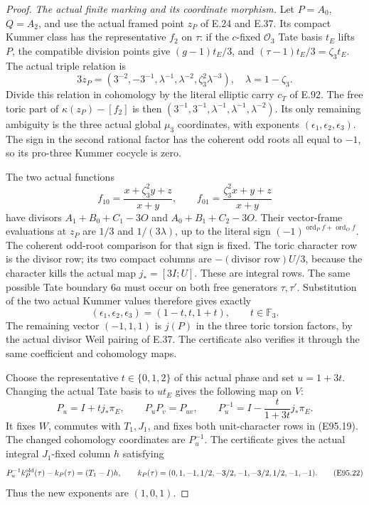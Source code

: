 \begin{proof}
\emph{The actual finite marking and its coordinate morphism.}
Let $P=A_0$, $Q=A_2$, and use the actual framed point
$z_P$ of E.24 and E.37. Its compact Kummer class has the
representative $f_2$ on $\tau$: if the $c$-fixed
$\mathcal O_3$ Tate basis $t_E$ lifts $P$, the compatible
division points give $(g-1)t_E/3$, and
$(\tau-1)t_E/3=\zeta_3t_E$. The actual triple relation is
\[
 3z_P=(3^{-2},-3^{-1},\lambda^{-1},\lambda^{-2},
                   \zeta_3^2\lambda^{-3}),
 \quad\lambda=1-\zeta_3.
 \tag{E95.18}
\]
Divide this relation in cohomology by the literal elliptic
carry $c_T$ of E.92. The free toric part of
$\kappa(z_P)-[f_2]$ is then
$(3^{-1},3^{-1},\lambda^{-1},\lambda^{-1},\lambda^{-2})$.
Its only remaining ambiguity is the three actual global
$\mu_3$ coordinates, with exponents
$(\epsilon_1,\epsilon_2,\epsilon_3)$. The sign in the
second rational factor has the coherent odd roots all
equal to $-1$, so its pro-three Kummer cocycle is zero.

The two actual functions
\[
 f_{10}=\frac{x+\zeta_3^2y+z}{x+y},\qquad
 f_{01}=\frac{\zeta_3^2x+y+z}{x+y}
 \tag{E95.19}
\]
have divisors $A_1+B_0+C_1-3O$ and
$A_0+B_1+C_2-3O$. Their vector-frame evaluations at
$z_P$ are $1/3$ and $1/(3\lambda)$, up to the literal
sign $(-1)^{\operatorname{ord}_P f+\operatorname{ord}_O f}$.
The coherent odd-root comparison for that sign is fixed.
The toric character row is the divisor row; its two
compact columns are $-(\text{divisor row})U/3$, because
the character kills the actual map $j_*=[3I;U]$.
These are integral rows. The same possible Tate boundary
$6a$ must occur on both free generators $\tau,\tau'$.
Substitution of the two actual Kummer values therefore
gives exactly
\[
       (\epsilon_1,\epsilon_2,\epsilon_3)
                   =(1-t,t,1+t),\qquad t\in\mathbb F_3.
 \tag{E95.20}
\]
The remaining vector $(-1,1,1)$ is $j(P)$ in the three
toric torsion factors, by the actual divisor Weil pairing
of E.37. The certificate also verifies it through the
same coefficient and cohomology maps.

Choose the representative $t\in\{0,1,2\}$ of this actual
phase and set $u=1+3t$. Changing the actual Tate basis
to $u t_E$ gives the following map on $V$:
\[
 P_u=I+t j_*\pi_E,\qquad
 P_uP_v=P_{uv},\qquad
 P_u^{-1}=I-\frac{t}{1+3t}j_*\pi_E.
 \tag{E95.21}
\]
It fixes $W$, commutes with $T_1,J_1$, and fixes both
unit-character rows in (E95.19). The changed cohomology
coordinates are $P_u^{-1}$. The certificate gives the
actual integral $J_1$-fixed column $h$ satisfying
\[
 P_u^{-1}k_P^{\rm old}(\tau)-k_P(\tau)=(T_1-I)h,
 \qquad
 k_P(\tau)=(0,1,-1,1/2,-3/2,-1,-3/2,1/2,-1,-1).
 \tag{E95.22}
\]
Thus the new exponents are $(1,0,1)$.


\end{proof}
